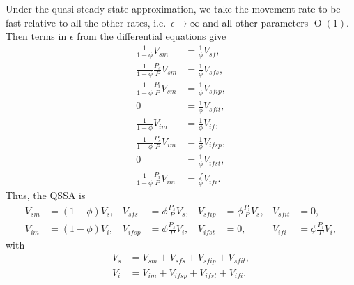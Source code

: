 \documentclass{article}
\begin{document}
Under the quasi-steady-state approximation, we take the movement rate
to be fast relative to all the other rates, i.e.~$\epsilon \to \infty$
and all other parameters $\operatorname{O}(1)$.  Then terms in
$\epsilon$ from the differential equations give
\begin{equation}
  \begin{split}
    \frac{1}{1 - \phi} V_{sm} &=
    \frac{1}{\phi} V_{sf},
    \\
    \frac{1}{1 - \phi} \frac{P_s}{P} V_{sm} &=
    \frac{1}{\phi} V_{sfs},
    \\
    \frac{1}{1 - \phi} \frac{P_i}{P} V_{sm} &=
    \frac{1}{\phi} V_{sfip},
    \\
    0 &=
    \frac{1}{\phi} V_{sfit},
    \\
    \frac{1}{1 - \phi} V_{im} &=
    \frac{1}{\phi} V_{if},
    \\
    \frac{1}{1 - \phi} \frac{P_s}{P} V_{im} &= \frac{1}{\phi} V_{ifsp},
    \\
    0 &= \frac{1}{\phi} V_{ifst},
    \\
    \frac{1}{1 - \phi} \frac{P_i}{P} V_{im} &= \frac{f}{\phi} V_{ifi}.
  \end{split}
\end{equation}
Thus, the QSSA is
\begin{equation}
  \begin{aligned}
    V_{sm} &= (1 - \phi) V_s,
    &
    V_{sfs} &= \phi \frac{P_s}{P} V_s,
    &
    V_{sfip} &= \phi \frac{P_i}{P} V_s,
    &
    V_{sfit} &= 0,
    \\
    V_{im} &= (1 - \phi) V_i,
    &
    V_{ifsp} &= \phi \frac{P_s}{P} V_i,
    &
    V_{ifst} &= 0,
    &
    V_{ifi} &= \phi \frac{P_i}{P} V_i,
  \end{aligned}
\end{equation}
with
\begin{equation}
  \begin{split}
    V_s &= V_{sm} + V_{sfs} + V_{sfip} + V_{sfit}, \\
    V_i &= V_{im} + V_{ifsp} + V_{ifst} + V_{ifi}.
  \end{split}
\end{equation}


\end{document}
